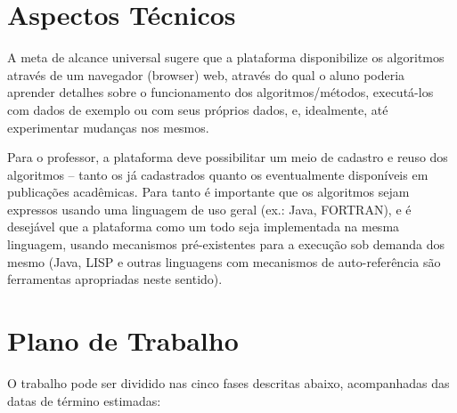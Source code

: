 \documentclass[11pt]{article}
\begin{document}
\section{Aspectos Técnicos}
A meta de alcance universal sugere que a plataforma disponibilize os algoritmos através de um navegador (browser) web, através do qual o aluno poderia  aprender detalhes sobre o funcionamento dos algoritmos/métodos, executá-los com dados de exemplo ou com seus próprios dados, e, idealmente, até experimentar mudanças nos mesmos.

Para o professor, a plataforma deve possibilitar um meio de cadastro e reuso dos algoritmos – tanto os já cadastrados quanto os eventualmente disponíveis em publicações acadêmicas. Para tanto é importante que os algoritmos sejam expressos usando uma linguagem de uso geral (ex.: Java, FORTRAN), e é desejável que a plataforma como um todo seja implementada na mesma linguagem, usando mecanismos pré-existentes para a execução sob demanda dos mesmo (Java, LISP e outras linguagens com mecanismos de auto-referência são ferramentas apropriadas neste sentido).
\section {Plano de Trabalho}
O trabalho pode ser dividido nas cinco fases descritas abaixo, acompanhadas das datas de término estimadas:
\end{document}
